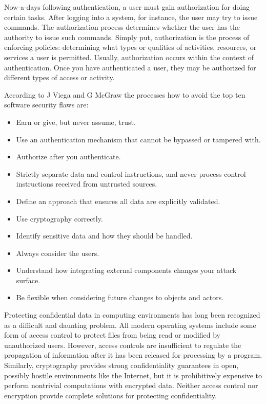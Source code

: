 Now-a-days following authentication, a user must gain authorization for doing certain tasks. After logging into a system, for instance, the user may try to issue commands. The authorization process determines whether the user has the authority to issue such commands. Simply put, authorization is the process of enforcing policies: determining what types or qualities of activities, resources, or services a user is permitted. Usually, authorization occurs within the context of authentication. Once you have authenticated a user, they may be authorized for different types of access or activity.

According to J Viega and G McGraw \cite{ref_92_viega2001building} the processes how to avoid the top ten software security flaws are:
\begin{itemize}
	\item Earn or give, but never assume, trust.
	
	\item Use an authentication mechanism that
	cannot be bypassed or tampered with.
	
	\item Authorize after you authenticate.
	
	\item Strictly separate data and control
	instructions, and never process control
	instructions received from untrusted sources.
	
	\item Define an approach that ensures all data are
	explicitly validated.

	\item Use cryptography correctly.
	 
	\item Identify sensitive data and how they should
	be handled.
	
	\item Always consider the users.

	\item Understand how integrating external
	components changes your attack surface.
	
	\item Be flexible when considering future changes
	to objects and actors.
	
	
\end{itemize}

Protecting confidential data in computing environments has long been recognized as a difficult and daunting problem. All modern operating systems include some form of access control to protect files from being read or modified by unauthorized users. However, access controls are insufficient to regulate the propagation of information after it has been released for processing by a program. Similarly,
cryptography provides strong confidentiality guarantees in open, possibly hostile environments like the Internet, but it is prohibitively expensive to perform nontrivial computations with encrypted data. Neither access control nor encryption
provide complete solutions for protecting confidentiality.

